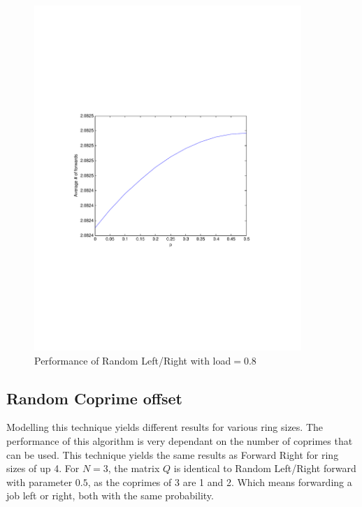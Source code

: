\documentclass[10pt,a4paper]{article}
\begin{document}
\begin{figure}[h!tb]
\centering
\includegraphics[clip=true, trim=9em 24em 9em 24em, width=0.9\textwidth]{resources/plotrandlrp.pdf}
\caption{Performance of Random Left/Right with load$=0.8$}
\label{validrlrp}
\end{figure}

\subsection{Random Coprime offset}
Modelling this technique yields different results for various ring sizes. The performance of this algorithm is very dependant on the number of coprimes that can be used. This technique yields the same results as Forward Right for ring sizes of up 4. For $N = 3$, the matrix $Q$ is identical to Random Left/Right forward with parameter $0.5$, as the coprimes of 3 are 1 and 2. Which means forwarding a job left or right, both with the same probability.
\end{document}
